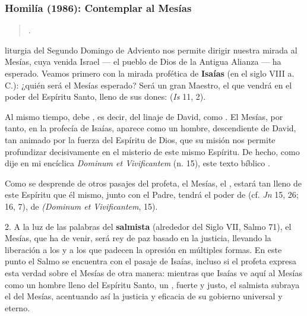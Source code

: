 \subsubsection{Homilía (1986): Contemplar al Mesías}


\begin{body} 
	\begin{quote}
		.
	\end{quote}
	
	 liturgia del Segundo Domingo de Adviento nos permite dirigir nuestra mirada al Mesías, cuya venida Israel --- el pueblo de Dios de la Antigua Alianza --- ha esperado. Veamos primero con la mirada profética de \textbf{Isaías} (en el siglo VIII a. C.): ¿quién será el Mesías esperado? Será un gran Maestro, el que vendrá en el poder del Espíritu Santo, lleno de sus dones:  (\emph{Is} 11, 2). 
	
	Al mismo tiempo, debe , es decir, del linaje de David, como . El Mesías, por tanto, en la profecía de Isaías, aparece como un hombre, descendiente de David, tan animado por la fuerza del Espíritu de Dios, que su misión nos permite profundizar decisivamente en el misterio de este mismo Espíritu. De hecho, como dije en mi encíclica \emph{Dominum et Vivificantem} (n. 15), este texto bíblico . 
	
	Como se desprende de otros pasajes del profeta, el Mesías, el , estará tan lleno de este Espíritu que él mismo, junto con el Padre, tendrá el poder de  (cf. \emph{Jn} 15, 26; 16, 7), de  \emph{(Dominum et Vivificantem}, 15). 
	
	2. A la luz de las palabras del \textbf{salmista} (alrededor del Siglo VII, Salmo 71), el Mesías, que ha de venir, será rey de paz basado en la justicia, llevando la liberación a los  y a los que padecen la opresión en múltiples formas. En este punto el Salmo se encuentra con el pasaje de Isaías, incluso si el profeta expresa esta verdad sobre el Mesías de otra manera: mientras que Isaías ve aquí al Mesías como un hombre lleno del Espíritu Santo, un , fuerte y justo, el salmista subraya el  del Mesías, acentuando así la justicia y eficacia de su gobierno universal y eterno. 
	

\end{body}
